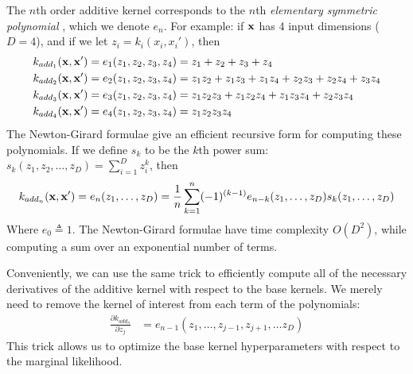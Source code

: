 The $n$th order additive kernel corresponds to the $n$th \textit{elementary symmetric polynomial}\cite{macdonald1998symmetric} \cite{stanley2001enumerative}, which we denote $e_n$.  For example:  if $\bf x$ has 4 input dimensions ($D = 4$), and if we let $z_i = k_i(x_i,x_i')$, then
\begin{align*}
k_{add_1}({\bf x, x'}) & = e_1( z_1, z_2, z_3, z_4 ) = z_1 + z_2 + z_3 + z_4 \\
k_{add_2}({\bf x, x'}) & = e_2( z_1, z_2, z_3, z_4 ) = z_1 z_2 + z_1 z_3 + z_1z_4 + z_2 z_3 + z_2 z_4 + z_3 z_4 \\
k_{add_3}({\bf x, x'}) & = e_3( z_1, z_2, z_3, z_4 ) = z_1 z_2 z_3 + z_1 z_2 z_4 + z_1 z_3 z_4 + z_2 z_3 z_4 \\
k_{add_4}({\bf x, x'}) & = e_4( z_1, z_2, z_3, z_4 ) = z_1 z_2 z_3 z_4
\end{align*}
The Newton-Girard formulae give an efficient recursive form for computing these polynomials.  If we define $s_k$ to be the $k$th power sum:  $s_k(z_1,z_2,\dots,z_D) = \sum_{i=1}^Dz_i^k$, then
\begin{equation}
k_{add_n}({\bf x, x'}) = e_n(z_1,\dots,z_D) = \frac{1}{n} \sum_{k=1}^n (-1)^{(k-1)} e_{n-k}(z_1,\dots,z_D)s_k(z_1,\dots,z_D)
\end{equation}
Where $e_0 \triangleq 1$.  The Newton-Girard formulae have time complexity $O( D^2 )$, while computing a sum over an exponential number of terms.

Conveniently, we can use the same trick to efficiently compute all of the necessary derivatives of the additive kernel with respect to the base kernels.  We merely need to remove the kernel of interest from each term of the polynomials:
\begin{align}
\frac{\partial k_{add_n}}{\partial z_j} & = e_{n-1}(z_1,\dots,z_{j-1},z_{j+1}, \dots z_D)
\end{align}
This trick allows us to optimize the base kernel hyperparameters with respect to the marginal likelihood.

